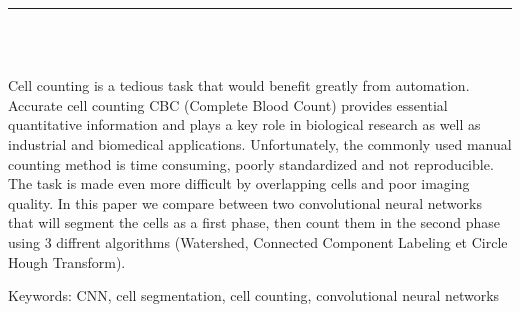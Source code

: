 \documentclass[12pt]{report}
\newenvironment{changemargin}[2]{%
\begin{list}{}{%
\setlength{\topsep}{0pt}%
\setlength{\leftmargin}{#1}%
\setlength{\rightmargin}{#2}%
\setlength{\listparindent}{\parindent}%
\setlength{\itemindent}{\parindent}%
\setlength{\parsep}{\parskip}%
}%
\item[]}{\end{list}}
\begin{document}
\thispagestyle{empty}

\begin{center}
    {\color{Black} \rule{3in}{1.4mm} }\\
    \vspace{0.1in}
    \scshape{\fontsize{34}{46}{\bfseries{\color{Black}{Abstract}}}}
    \\
    \vspace{0.6in}
\end{center}
\begin{changemargin}{0.9cm}{0.9cm}
\hspace*{0.16in}

Cell counting is a tedious task that would benefit greatly from automation. Accurate cell counting CBC (Complete Blood Count) provides essential quantitative information and plays a key role in biological research as well as industrial and biomedical applications. Unfortunately, the commonly used manual counting method is time consuming, poorly standardized and not reproducible. The task is made even more difficult by overlapping cells and poor imaging quality. In this paper we compare between two convolutional neural networks that will segment the cells as a first phase, then count them in the second phase using 3 diffrent algorithms (Watershed, Connected Component Labeling et Circle Hough Transform).

\end{changemargin}

\vspace{1in}

\begin{changemargin}{0.9cm}{0.9cm}
Keywords: CNN, cell segmentation, cell counting, convolutional neural networks
\end{changemargin}

\newpage

\tableofcontents

\newpage

\listoffigures

\newpage

\listoftables
\end{document}
